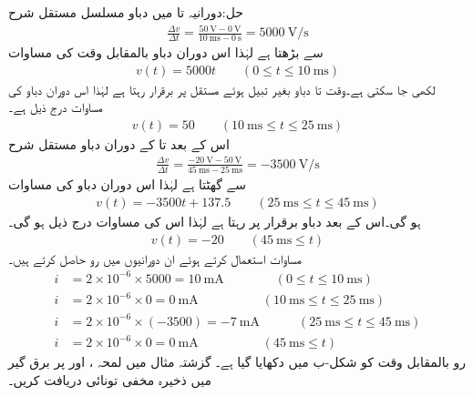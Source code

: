 حل:دورانیہ  تا  میں دباو مسلسل مستقل شرح
\begin{align*}
\frac{\Delta v}{\Delta t}=\frac{\SI{50}{\volt}-\SI{0}{\volt}}{\SI{10}{\milli\second}-\SI{0}{\second}}=\SI{5000}{\volt\per\second}
\end{align*}
 سے بڑھتا ہے لہٰذا اس دوران دباو بالمقابل وقت کی مساوات 
\begin{align*}
v(t)=5000 t \quad \quad (0 \le t \le \SI{10}{\milli\second})
\end{align*}
لکھی جا سکتی ہے۔وقت  تا  دباو بغیر تبیل ہوئے مستقل  پر برقرار رہتا ہے لہٰذا اس دوران دباو کی مساوات درج ذیل ہے۔
\begin{align*}
v(t)=50 \quad \quad (\SI{10}{\milli\second} \le t \le \SI{25}{\milli\second})
\end{align*}
اس کے بعد  تا  کے دوران دباو مستقل شرح
\begin{align*}
\frac{\Delta v}{\Delta t}=\frac{\SI{-20}{\volt}-\SI{50}{\volt}}{\SI{45}{\milli\second}-\SI{25}{\milli\second}}=\SI{-3500}{\volt \per \second}
\end{align*}
سے گھٹتا ہے لہٰذا اس دوران دباو کی مساوات
\begin{align*}
v(t)=-3500 t +137.5 \quad \quad (\SI{25}{\milli\second} \le t \le \SI{45}{\milli\second})
\end{align*}
ہو گی۔اس کے بعد دباو برقرار  پر رہتا ہے لہٰذا اس کی مساوات درج ذیل ہو گی۔
\begin{align*}
v(t)=-20 \quad \quad (\SI{45}{\milli\second} \le t)
\end{align*}
مساوات  استعمال کرتے ہوئے ان دورانیوں میں رو حاصل کرتے ہیں۔
\begin{align*}
i&=2\times 10^{-6} \times 5000=\SI{10}{\milli\ampere} \quad \quad \quad \quad  (0 \le t \le \SI{10}{\milli\second})\\
i&=2\times 10^{-6} \times 0=\SI{0}{\milli\ampere} \quad \quad \quad \quad \quad   (\SI{10}{\milli\second} \le t \le \SI{25}{\milli\second})\\
i&=2\times 10^{-6} \times (-3500)=\SI{-7}{\milli\ampere} \quad \quad   \quad  (\SI{25}{\milli\second} \le t \le \SI{45}{\milli\second})\\
i&=2\times 10^{-6} \times 0=\SI{0}{\milli\ampere} \quad \quad \quad \quad   \quad(\SI{45}{\milli\second} \le t)
\end{align*}
رو بالمقابل وقت کو شکل-ب میں دکھایا گیا ہے۔
گزشتہ مثال میں لمحہ ،  اور  پر برق گیر میں ذخیرہ مخفی تونائی دریافت کریں۔

